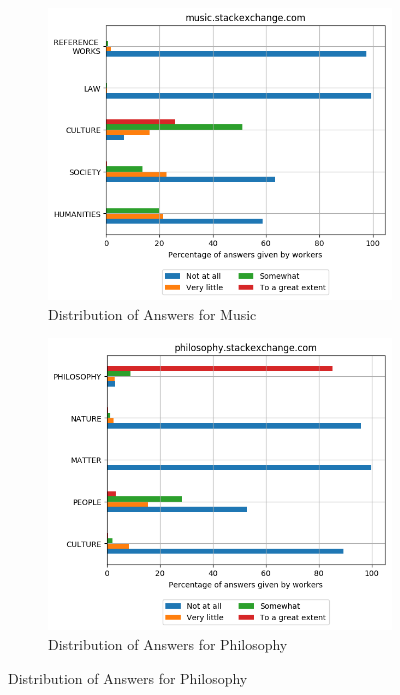 \begin{figure}[H]
     \begin{subfigure}{0.5\textwidth}
    \centering
        \includegraphics[width=1\linewidth]{imgs/crowd-results/music_stackexchange_com}
        \caption{Distribution of Answers for Music}
        \label{fig:crowd-results-musisc}
    \end{subfigure}%
    \begin{subfigure}{0.5\textwidth}
    \centering
        \includegraphics[width=1\linewidth]{imgs/crowd-results/philosophy_stackexchange_com}
        \caption{Distribution of Answers for Philosophy}
        \label{fig:crowd-results-philosophy}
    \end{subfigure}
    

\end{figure}
